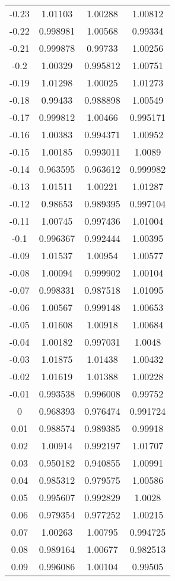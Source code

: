 \begin{table}[h!]
\begin{tabular}{|c|c|c|c|}
-0.23 & 1.01103 & 1.00288 & 1.00812 \\
-0.22 & 0.998981 & 1.00568 & 0.99334 \\
-0.21 & 0.999878 & 0.99733 & 1.00256 \\
-0.2 & 1.00329 & 0.995812 & 1.00751 \\
-0.19 & 1.01298 & 1.00025 & 1.01273 \\
-0.18 & 0.99433 & 0.988898 & 1.00549 \\
-0.17 & 0.999812 & 1.00466 & 0.995171 \\
-0.16 & 1.00383 & 0.994371 & 1.00952 \\
-0.15 & 1.00185 & 0.993011 & 1.0089 \\
-0.14 & 0.963595 & 0.963612 & 0.999982 \\
-0.13 & 1.01511 & 1.00221 & 1.01287 \\
-0.12 & 0.98653 & 0.989395 & 0.997104 \\
-0.11 & 1.00745 & 0.997436 & 1.01004 \\
-0.1 & 0.996367 & 0.992444 & 1.00395 \\
-0.09 & 1.01537 & 1.00954 & 1.00577 \\
-0.08 & 1.00094 & 0.999902 & 1.00104 \\
-0.07 & 0.998331 & 0.987518 & 1.01095 \\
-0.06 & 1.00567 & 0.999148 & 1.00653 \\
-0.05 & 1.01608 & 1.00918 & 1.00684 \\
-0.04 & 1.00182 & 0.997031 & 1.0048 \\
-0.03 & 1.01875 & 1.01438 & 1.00432 \\
-0.02 & 1.01619 & 1.01388 & 1.00228 \\
-0.01 & 0.993538 & 0.996008 & 0.99752 \\
0 & 0.968393 & 0.976474 & 0.991724 \\
0.01 & 0.988574 & 0.989385 & 0.99918 \\
0.02 & 1.00914 & 0.992197 & 1.01707 \\
0.03 & 0.950182 & 0.940855 & 1.00991 \\
0.04 & 0.985312 & 0.979575 & 1.00586 \\
0.05 & 0.995607 & 0.992829 & 1.0028 \\
0.06 & 0.979354 & 0.977252 & 1.00215 \\
0.07 & 1.00263 & 1.00795 & 0.994725 \\
0.08 & 0.989164 & 1.00677 & 0.982513 \\
0.09 & 0.996086 & 1.00104 & 0.99505 \\

\end{tabular}
\end{table}
